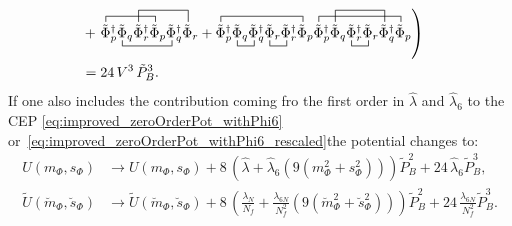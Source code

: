 \begin{align}
        \nonumber \\ 
           & +\left. \contraction{}{ \tilde\Phi }{ {}_{p}^{\dagger} \tilde\Phi_{q} \tilde\Phi_{r}^{\dagger} }{ \tilde \Phi}
                     \bcontraction{ \tilde\Phi_{p}^{\dagger} }{ \tilde\Phi }{ {}_{q} \tilde\Phi_{r}^{\dagger} \tilde\Phi_{p} }{ \tilde\Phi }
                     \contraction[2ex]{ \tilde\Phi_{p}^{\dagger} \tilde\Phi_{q} }{ \tilde\Phi }{ {}_{r}^{\dagger} \tilde\Phi_{p} \tilde\Phi_{q}^{\dagger} }{ \tilde\Phi} 
                     \tilde\Phi_{p}^{\dagger} \tilde\Phi_{q} \tilde\Phi_{r}^{\dagger} \tilde\Phi_{p} \tilde\Phi_{q}^{\dagger} \tilde\Phi_{r}
                   + \contraction{}{ \tilde\Phi }{ {}_{p}^{\dagger} \tilde\Phi_{q} \tilde\Phi_{q}^{\dagger} \tilde\Phi_{r} \tilde\Phi_{r}^{\dagger} }{ \tilde\Phi}
                     \bcontraction{ \tilde\Phi_{p}^{\dagger} }{ \tilde\Phi }{ {}_{q} }{ \tilde\Phi }
                     \bcontraction{ \tilde\Phi_{p}^{\dagger} \tilde\Phi_{q} \tilde\Phi_{q}^{\dagger} }{ \tilde\Phi }{ {}_{r} }{ \tilde\Phi}
                     \tilde\Phi_{p}^{\dagger} \tilde\Phi_{q} \tilde\Phi_{q}^{\dagger} \tilde\Phi_{r} \tilde\Phi_{r}^{\dagger} \tilde\Phi_{p}
                     \contraction{}{ \tilde\Phi }{ {}_{p}^{\dagger} \tilde\Phi_{q} \tilde\Phi_{r}^{\dagger} \tilde\Phi_{r} \tilde\Phi_{q}^{\dagger} }{ \tilde \Phi }
                     \contraction[2ex]{ \tilde\Phi_{p}^{\dagger} }{ \tilde\Phi }{ {}_{q} \tilde\Phi_{r}^{\dagger} \tilde\Phi_{r} }{\tilde \Phi}
                     \bcontraction{ \tilde\Phi_{p}^{\dagger} \tilde\Phi_{q} }{ \tilde\Phi }{ {}_{r}^{\dagger} }{ \tilde\Phi }
                     \tilde\Phi_{p}^{\dagger} \tilde\Phi_{q} \tilde\Phi_{r}^{\dagger} \tilde\Phi_{r} \tilde\Phi_{q}^{\dagger} \tilde\Phi_{p}
                     \right)
        \nonumber \\
                 & = 24\, V^3\, \tilde P_B^3.
\end{align}
If one also includes the contribution coming fro the first order in $\hat\lambda$ and $\hat\lambda_6$ to the CEP \eqref{eq:improved_zeroOrderPot_withPhi6} 
or~\eqref{eq:improved_zeroOrderPot_withPhi6_rescaled}the potential
changes to:
\begin{align}\label{eq:CEP_oneLoopAddition_withDetAndLambda6}
 U(m_{\Phi}, s_{\Phi}) & \rightarrow U(m_{\Phi}, s_{\Phi}) + 8\,\left(\hat \lambda + \hat\lambda_6\left( 9\left( m_{\Phi}^2 + s_{\Phi}^2 \right) \right) \right) \tilde P_B^2
                        + 24\, \hat\lambda_6 \tilde P_B^3,
      \\ \label{eq:CEP_oneLoopAddition_withDetAndLambda6_rescaled}
 \tilde U(\breve{m}_{\Phi},\breve{s}_{\Phi}) & \rightarrow  
       \tilde U(\breve{m}_{\Phi},\breve{s}_{\Phi}) + 
                        8\,\left( \frac{\lambda_N}{N_f} + \frac{\lambda_{6N}}{N_f^2}\left( 9\left( \breve{m}_{\Phi}^2 + \breve{s}_{\Phi}^2 \right) \right) \right) \tilde P_B^2
                        + 24\, \frac{\lambda_{6N}}{N_f^2} \tilde P_B^3.
\end{align}
